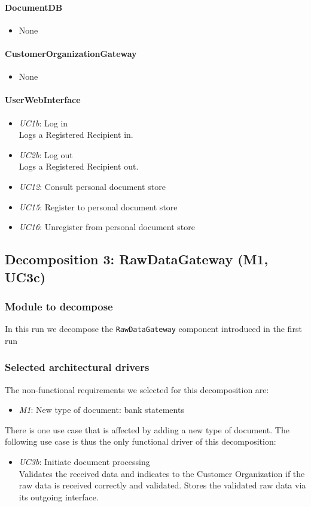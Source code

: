 \documentclass[a4paper,10pt]{article}
\begin{document}
\paragraph{DocumentDB}
\begin{itemize}
	\item None
\end{itemize}

\paragraph{CustomerOrganizationGateway}
\begin{itemize}
	\item None
\end{itemize}

\paragraph{UserWebInterface}
\begin{itemize}
	\item \emph{UC1b}: Log in\\ Logs a Registered Recipient in.
    \item \emph{UC2b}: Log out\\ Logs a Registered Recipient out. 
	\item \emph{UC12}: Consult personal document store
    \item \emph{UC15}: Register to personal document store
    \item \emph{UC16}: Unregister from personal document store
\end{itemize}

\subsection{Decomposition 3: RawDataGateway (M1, UC3c)}
\subsubsection{Module to decompose}
In this run we decompose the \texttt{RawDataGateway} component  introduced in the first run

\subsubsection{Selected architectural drivers}
The non-functional requirements we selected for this decomposition are:
\begin{itemize}
	\item \emph{M1}: New type of document: bank statements
\end{itemize}
There is one use case that is affected by adding a new type of document. The following use case is thus the only functional driver of this decomposition:
\begin{itemize}
	\item \emph{UC3b}: Initiate document processing\\ Validates the received data and indicates to the Customer Organization if the raw data is received correctly and validated. Stores the validated raw data via its outgoing interface.
\end{itemize}
\end{document}
